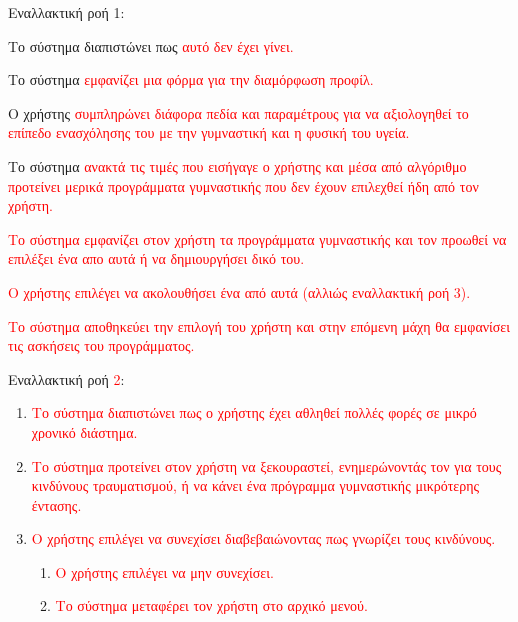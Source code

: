     

Εναλλακτική ροή 1:
\begin{enumerate}[label=2.\alph*.,ref=2.\alph*]
    \item Το σύστημα διαπιστώνει πως \textcolor{red}{αυτό δεν έχει γίνει.}
    \item Το σύστημα \textcolor{red}{εμφανίζει μια φόρμα για την διαμόρφωση προφίλ.}
    \item Ο χρήστης \textcolor{red}{συμπληρώνει διάφορα πεδία και παραμέτρους για να αξιολογηθεί το επίπεδο ενασχόλησης του με την γυμναστική και η φυσική του υγεία.}
    \item Το σύστημα \textcolor{red}{ανακτά τις τιμές που εισήγαγε ο χρήστης και μέσα από αλγόριθμο προτείνει μερικά προγράμματα γυμναστικής που δεν έχουν επιλεχθεί ήδη από τον χρήστη.}
    \item \textcolor{red}{Το σύστημα εμφανίζει στον χρήστη τα προγράμματα γυμναστικής και τον προωθεί να επιλέξει ένα απο αυτά ή να δημιουργήσει δικό του.
    \item Ο χρήστης επιλέγει να ακολουθήσει ένα από αυτά (αλλιώς εναλλακτική ροή 3).
    \item Το σύστημα αποθηκεύει την επιλογή του χρήστη και στην επόμενη μάχη θα εμφανίσει τις ασκήσεις του προγράμματος.}
\end{enumerate}

Εναλλακτική ροή \textcolor{red}{2}:
\begin{enumerate}[label=4.\alph*.,ref=4.\alph*]

    \item \textcolor{red}{Το σύστημα διαπιστώνει πως ο χρήστης έχει αθληθεί πολλές φορές σε μικρό χρονικό διάστημα.}
    \item \textcolor{red}{Το σύστημα προτείνει στον χρήστη να ξεκουραστεί, ενημερώνοντάς τον για τους κινδύνους τραυματισμού, ή να κάνει ένα πρόγραμμα γυμναστικής μικρότερης έντασης.}
    \item \textcolor{red}{Ο χρήστης επιλέγει να συνεχίσει διαβεβαιώνοντας πως γνωρίζει τους κινδύνους.}
\begin{enumerate}[label=4.\alph*.,ref=4.\alph*]
    \item \textcolor{red}{Ο χρήστης επιλέγει να μην συνεχίσει.}
    \item \textcolor{red}{Το σύστημα μεταφέρει τον χρήστη στο αρχικό μενού.}
\end{enumerate}
\end{enumerate}



